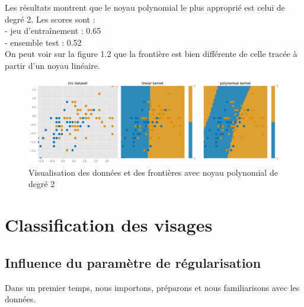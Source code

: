 \documentclass{book}
\begin{document}
Les résultats montrent que le noyau polynomial le plus approprié est celui de degré 2. Les scores sont :\\
- jeu d'entraînement : 0.65\\
- ensemble test : 0.52\\
On peut voir sur la figure 1.2 que la frontière est bien différente de celle tracée à partir d'un noyau linéaire.

\begin{figure}[H] %
    \centering
    \includegraphics[width=1\textwidth]{figure 2.png}
    \caption{Visualisation des données et des frontières avec  noyau polynomial de degré 2}
    \label{fig:exemple2}
\end{figure}

\chapter{Classification des visages}

\section{Influence du paramètre de régularisation}

Dans un premier temps, nous importons, préparons et nous familiarisons avec les données.
\end{document}

